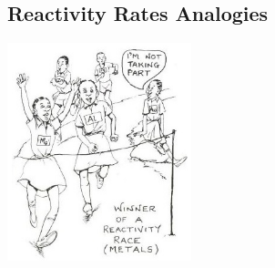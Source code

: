 \begin{multicols}{2}
\subsection{Reactivity Rates Analogies} 

\begin{center}
\includegraphics[width=0.4\textwidth]{./img/source/reactivity-race.jpg}
\end{center}


\vfill
\columnbreak


\end{multicols}
